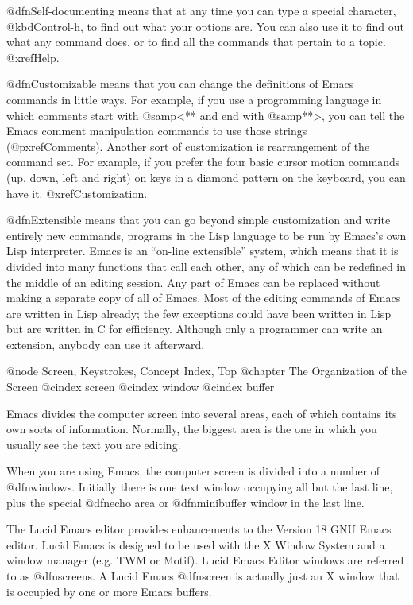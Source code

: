   @dfn{Self-documenting} means that at any time you can type a special
character, @kbd{Control-h}, to find out what your options are.  You can
also use it to find out what any command does, or to find all the commands
that pertain to a topic.  @xref{Help}.

  @dfn{Customizable} means that you can change the definitions of Emacs
commands in little ways.  For example, if you use a programming language in
which comments start with @samp{<**} and end with @samp{**>}, you can tell
the Emacs comment manipulation commands to use those strings
(@pxref{Comments}).  Another sort of customization is rearrangement of the
command set.  For example, if you prefer the four basic cursor motion
commands (up, down, left and right) on keys in a diamond pattern on the
keyboard, you can have it.  @xref{Customization}.

  @dfn{Extensible} means that you can go beyond simple customization and
write entirely new commands, programs in the Lisp language to be run by
Emacs's own Lisp interpreter.  Emacs is an ``on-line extensible'' system,
which means that it is divided into many functions that call each other,
any of which can be redefined in the middle of an editing session.  Any
part of Emacs can be replaced without making a separate copy of all of
Emacs.  Most of the editing commands of Emacs are written in Lisp already;
the few exceptions could have been written in Lisp but are written in C for
efficiency.  Although only a programmer can write an extension, anybody can
use it afterward.

@node Screen, Keystrokes, Concept Index, Top
@chapter The Organization of the Screen
@cindex screen
@cindex window
@cindex buffer

  Emacs divides the computer screen into several areas, each of which contains
its own sorts of information.  Normally, the biggest area is the one
in which you usually see the text you are editing.

  When you are using Emacs, the computer screen is divided into a number of
@dfn{windows}.  Initially there is one text window occupying all but the
last line, plus the special @dfn{echo area} or @dfn{minibuffer window} in
the last line.  

  The Lucid Emacs editor provides enhancements to the Version 18 GNU Emacs
editor.
Lucid Emacs is designed 
to be used with the X Window System and a window manager (e.g. TWM or Motif).
Lucid Emacs Editor windows are referred to as @dfn{screens}.
A Lucid Emacs @dfn{screen} is actually just an X window that is occupied by 
one or more Emacs buffers.  

